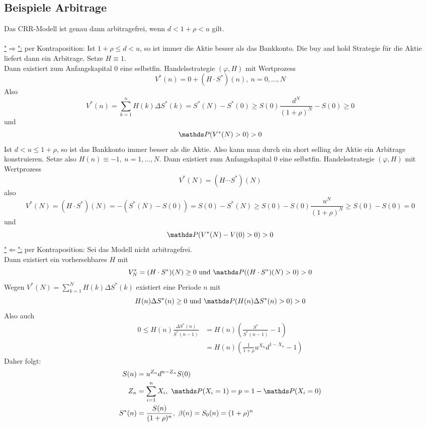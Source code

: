 \subsection{Beispiele Arbitrage}
\label{sub:bsp_arbitrage}
Das CRR-Modell ist genau dann arbitragefrei, wenn $d<1+\rho<u$ gilt.\\

\\
\uline{"$\Rightarrow$":} per Kontraposition: Ist $1+\rho \le d<u$, so ist immer die Aktie besser als das Bankkonto.
Die buy and hold Strategie für die Aktie liefert dann ein Arbitrage.
Setze $H\equiv 1$.\\
Dann existiert zum Anfangskapital 0 eine selbstfin. Handelsstrategie $(\varphi,H)$ mit Wertprozess
\[
V^*(n)=0+(H\cdot S^*)(n),~ n=0,\dots,N
\]
Also
\[
V^*(n)=\sum_{k=1}^{n}H(k)\Delta S^*(k)=S^*(N)-S^*(0)\ge S(0)\frac{d^N}{(1+\rho)^N}-S(0)\ge 0
\]
und 
\[
\Pw(V^*(N)>0)>0
\]
Ist  $d<u\le 1+\rho$, so ist das Bankkonto immer besser als die Aktie.
Also kann man durch ein short selling der Aktie ein Arbitrage konstruieren.
Setze also $H(n)\equiv -1,~ n=1,\dots,N$.
Dann existiert zum Anfangskapital 0 eine selbstfin. Handelsstrategie $(\varphi,H)$ mit Wertprozess
\[
V^*(N)=(H\cdots S^*)(N)
\] 
also
\[
V^*(N)=(H\cdot S^*)(N)=-(S^*(N)-S(0))=S(0)-S^*(N)\ge S(0)-S(0)\frac{u^N}{(1+\rho)^N}\ge S(0)-S(0)=0
\]
und 
\[
\Pw(V^*(N)-V(0)>0)>0
\]
\newpage
\uline{"$\Leftarrow$":} per Kontraposition: Sei das Modell nicht arbitragefrei.\\
Dann existiert ein vorhersehbares $H$ mit
\[
V^*_N=(H\cdot S^*)(N)\ge 0 \text{ und } \Pw((H\cdot S^*)(N)>0)>0
\]
Wegen $V^*(N)=\sum_{k=1}^{N}H(k)\Delta S^*(k)$ existiert eine Periode $n$ mit 
\[
H(n)\Delta S^*(n)\ge 0 \text{ und } \Pw(H(n)\Delta S^*(n)>0)>0
\]
Also auch
\begin{equation*}
\begin{aligned}
	0\le H(n)\frac{\Delta S^*(n)}{S^*(n-1)}&=H(n)\left(\frac{S^*}{S^*(n-1)}-1\right)\\
	&= H(n)\left(\frac{1}{1+\rho}u^{X_n}d^{1-X_n}-1\right)
\end{aligned}
\end{equation*}
Daher folgt:
\begin{equation*}
\begin{aligned}
	S(n)&=u^{Z_n}d^{n-Z_n}S(0)\\
	Z_n&=\sum_{i=1}^{n}X_i,~ \Pw(X_i=1)=p=1-\Pw(X_i=0)\\
	S^*(n)&=\frac{S(n)}{(1+\rho)^n},~ \beta(n)=S_0(n)=(1+\rho)^n	
\end{aligned}
\end{equation*}
